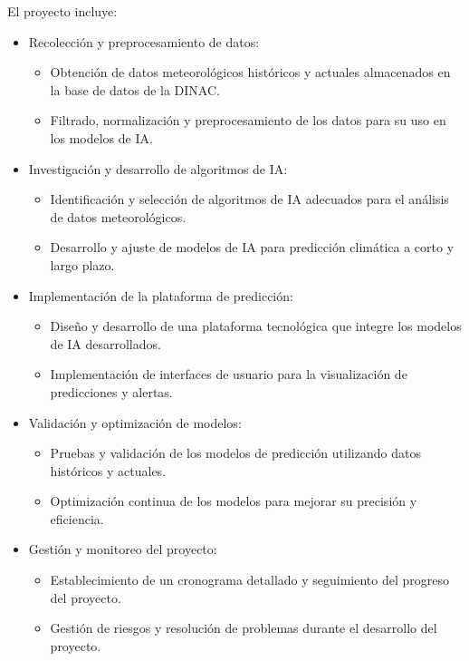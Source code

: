 \documentclass[
11pt, %
codirector, %
]{charter}
\begin{document}
El proyecto incluye:
\begin{itemize}
	\item Recolección y preprocesamiento de datos:
		\begin{itemize}
		\item Obtención de datos meteorológicos históricos y actuales almacenados en la base de
datos de la DINAC.
		\item Filtrado, normalización y preprocesamiento de los datos para su uso en los modelos de IA.
		\end{itemize}
	\item Investigación y desarrollo de algoritmos de IA:
		\begin{itemize}
		\item Identificación y selección de algoritmos de IA adecuados para el análisis de datos meteorológicos.
		\item Desarrollo y ajuste de modelos de IA para predicción climática a corto y largo plazo.
		\end{itemize}
	\item Implementación de la plataforma de predicción:
		\begin{itemize}
		\item Diseño y desarrollo de una plataforma tecnológica que integre los modelos de IA desarrollados.
		\item Implementación de interfaces de usuario para la visualización de predicciones y alertas.
		\end{itemize}
	\item Validación y optimización de modelos:
		\begin{itemize}
		\item Pruebas y validación de los modelos de predicción utilizando datos históricos y actuales.
		\item Optimización continua de los modelos para mejorar su precisión y eficiencia.
		\end{itemize}
	\item Gestión y monitoreo del proyecto:
		\begin{itemize}
		\item Establecimiento de un cronograma detallado y seguimiento del progreso del proyecto.
		\item Gestión de riesgos y resolución de problemas durante el desarrollo del proyecto.
		\end{itemize}
	
\end{itemize}
\end{document}
